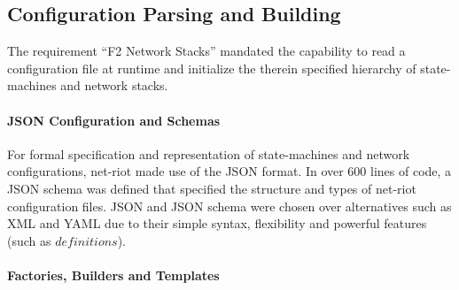 \subsection{Configuration Parsing and Building}
The requirement \enquote{F2 Network Stacks} mandated the capability to read a configuration file at runtime and initialize the therein specified hierarchy of state-machines and network stacks.

\paragraph{JSON Configuration and Schemas} For formal specification and representation of state-machines and network configurations, net-riot made use of the \ac{JSON} format. In over 600 lines of code, a \ac{JSON} schema was defined that specified the structure and types of net-riot configuration files. \ac{JSON} and \ac{JSON} schema were chosen over alternatives such as XML and YAML due to their simple syntax, flexibility and powerful features (such as $definitions$).

\paragraph{Factories, Builders and Templates}

